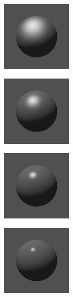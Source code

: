 \begin{Figure}
    \begin{FigureSub}[$p=10$]
        \includegraphics[width=3.53cm]{image/RasterizationIOW/SphereP1.png}
    \end{FigureSub}
    \begin{FigureSub}[$p=30$]
        \includegraphics[width=3.53cm]{image/RasterizationIOW/SphereP2.png}
    \end{FigureSub}
    \begin{FigureSub}[$p=100$]
        \includegraphics[width=3.53cm]{image/RasterizationIOW/SphereP3.png}
    \end{FigureSub}
    \begin{FigureSub}[$p=300$]
        \includegraphics[width=3.53cm]{image/RasterizationIOW/SphereP4.png}
    \end{FigureSub}
\end{Figure}